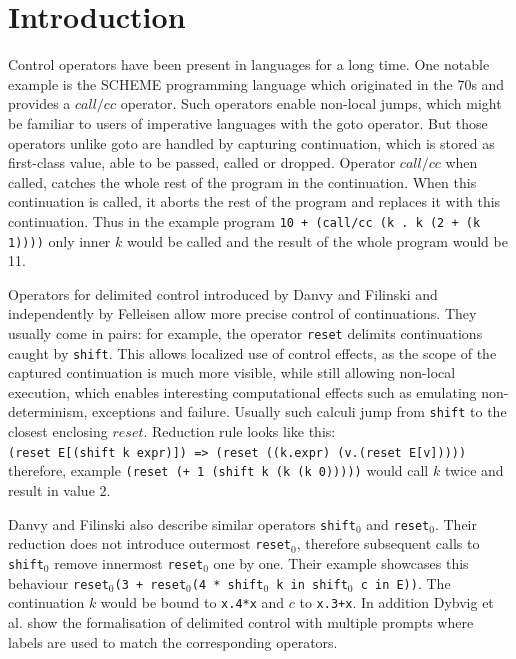 \documentclass[shortabstract,english,mgr]{iithesis}
\author         {Paweł Dybiec}
\begin{document}
\chapter{Introduction}

Control operators have been present in languages for a long time. One notable example is the SCHEME programming language which originated in the 70s\cite{scheme} and provides a $call/cc$ operator. Such operators enable non-local jumps, which might be familiar to users of imperative languages with the goto operator. But those operators unlike goto are handled by capturing continuation, which is stored as first-class value, able to be passed, called or dropped.
Operator $call/cc$  when called, catches the whole rest of the program in the continuation.
When this continuation is called, it aborts the rest of the program and replaces it with this continuation.
Thus in the example program \texttt{10 + (call/cc (\lambda k . k (2 + (k 1))))} only inner $k$ would be called and the result of the whole program would be 11.

Operators for delimited control introduced by Danvy and Filinski\cite{abstracting} and independently by Felleisen\cite{prompts} allow more precise control of continuations.
 They usually come in pairs: for example, the operator \texttt{reset} delimits continuations caught by \texttt{shift}. This allows localized use of control effects, as the scope of the captured continuation is much more visible, while  still allowing non-local execution, which enables interesting computational effects such as emulating non-determinism, exceptions and failure.
Usually such calculi jump from \texttt{shift} to the closest enclosing $reset$.
Reduction rule looks like this: \\
\texttt{(reset E[(shift k expr)])  => (reset ((\lambda k.expr) (\lambda v.(reset E[v]))))}
\\ therefore,  example \texttt{(reset (+ 1 (shift k (k (k 0)))))} would call $k$ twice and result in value $2$.

Danvy and Filinski\cite{functional_abstraction} also describe similar operators \texttt{shift$_0$} and \texttt{reset$_0$}. Their reduction does not introduce outermost \texttt{reset$_0$}, therefore subsequent calls to \texttt{shift$_0$} remove innermost \texttt{reset$_0$} one by one.
Their example showcases this behaviour \texttt{reset$_0$(3 + reset$_0$(4 * shift$_0$ k in shift$_0$ c in E))}. The continuation $k$ would be bound to \texttt{\lambda x.4*x} and $c$ to \texttt{\lambda x.3+x}.
In addition Dybvig et al.\cite{monadic} show the formalisation of delimited control with multiple prompts where labels are used to match the corresponding operators.
\end{document}
